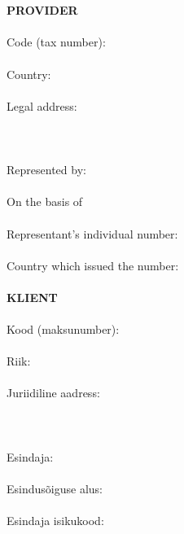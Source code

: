 \begin{Form}
\begin{paracol}{3}
{        \\
        \\
        \textbf{PROVIDER}\\
        \\
        Code (tax number):\\
        \\
        Country:\\
        \\
        Legal address:\\
        \\
        \\
        \\
        Represented by:\\
        \\
        On the basis of\\
        \\
        Representant's individual number:\\
        \\
        Country which issued the number:\\
        \\}
        {\textbf{KLIENT}\\
        \\
        Kood (maksunumber):\\
        \\
        Riik:\\
        \\
        Juriidiline aadress:\\
        \\
        \\
        \\
        Esindaja:\\
        \\
        Esindusõiguse alus:\\
        \\
        Esindaja isikukood:\\
        \\
}
\end{paracol}
\end{Form}
